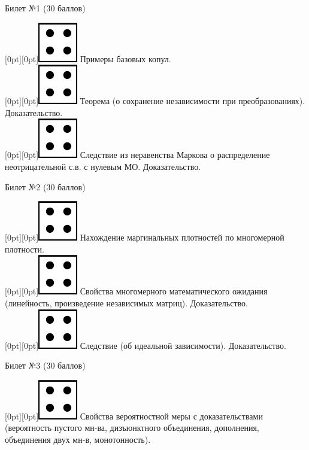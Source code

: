 \documentclass[preview]{standalone}
\begin{document}
\begin{center} {\Large Билет №1 (30 баллов)} \end{center}
\raisebox{-1pt}[0pt][0pt]{\includegraphics[width=0.02\linewidth]{4.png}} Примеры базовых копул. \\
\raisebox{-1pt}[0pt][0pt]{\includegraphics[width=0.02\linewidth]{4.png}} Теорема (о сохранение независимости при преобразованиях). Доказательство. \\ 
\raisebox{-1pt}[0pt][0pt]{\includegraphics[width=0.02\linewidth]{4.png}} Следствие из неравенства Маркова о распределение неотрицательной с.в. с нулевым МО. Доказательство. \\
\begin{center} {\Large Билет №2 (30 баллов)} \end{center}
\raisebox{-1pt}[0pt][0pt]{\includegraphics[width=0.02\linewidth]{4.png}} Нахождение маргинальных плотностей по многомерной плотности. \\
\raisebox{-1pt}[0pt][0pt]{\includegraphics[width=0.02\linewidth]{4.png}} Свойства многомерного математического ожидания (линейность, произведение независимых матриц). Доказательство. \\ 
\raisebox{-1pt}[0pt][0pt]{\includegraphics[width=0.02\linewidth]{4.png}} Следствие (об идеальной зависимости). Доказательство. \\
\begin{center} {\Large Билет №3 (30 баллов)} \end{center}
\raisebox{-1pt}[0pt][0pt]{\includegraphics[width=0.02\linewidth]{4.png}} Свойства вероятностной меры с доказательствами (вероятность пустого мн-ва, дизъюнктного объединения, дополнения, объединения двух мн-в, монотонность). \\
\end{document}
